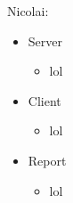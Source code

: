 Nicolai: 
\begin{itemize}
	\item Server
	\begin{itemize}
		\item lol
	\end{itemize}
	\item Client
	\begin{itemize}
		\item lol
	\end{itemize}
	\item Report
	\begin{itemize}
		\item lol
	\end{itemize}
\end{itemize}